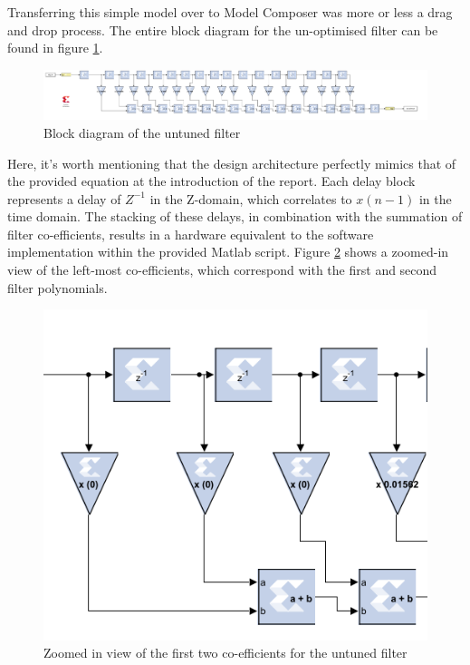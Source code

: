 \documentclass[12pt,a4paper]{article}
\begin{document}
Transferring this simple model over to Model Composer was more or less a drag and drop process. The entire block diagram for the un-optimised filter can be found in figure \ref{fig:untuned_block}.

\begin{figure}[H]
    \centering
    \includegraphics[scale=0.25]{images/untuned_block.PNG}
    \caption{Block diagram of the untuned filter}
    \label{fig:untuned_block}
\end{figure}

Here, it's worth mentioning that the design architecture perfectly mimics that of the provided equation at the introduction of the report. Each delay block represents a delay of $Z^{-1}$ in the Z-domain, which correlates to $x(n-1)$ in the time domain. The stacking of these delays, in combination with the summation of filter co-efficients, results in a hardware equivalent to the software implementation within the provided Matlab script. Figure \ref{fig:untuned_block_close} shows a zoomed-in view of the left-most co-efficients, which correspond with the first and second filter polynomials.

\begin{figure}[H]
    \centering
    \includegraphics[scale=0.33]{images/untuned_block_close.PNG}
    \caption{Zoomed in view of the first two co-efficients for the untuned filter}
    \label{fig:untuned_block_close}
\end{figure}
\end{document}
